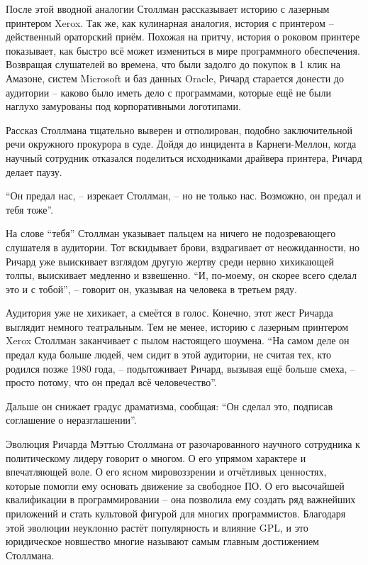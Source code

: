 После этой вводной аналогии Столлман рассказывает историю с лазерным принтером Xerox. Так же, как кулинарная аналогия, история с принтером -- действенный ораторский приём. Похожая на притчу, история о роковом принтере показывает, как быстро всё может измениться в мире программного обеспечения. Возвращая слушателей во времена, что были задолго до покупок в 1 клик на Амазоне, систем Microsoft и баз данных Oracle, Ричард старается донести до аудитории -- каково было иметь дело с программами, которые ещё не были наглухо замурованы под корпоративными логотипами.

Рассказ Столлмана тщательно выверен и отполирован, подобно заключительной речи окружного прокурора в суде. Дойдя до инцидента в Карнеги-Меллон, когда научный сотрудник отказался поделиться исходниками драйвера принтера, Ричард делает паузу.

``Он предал нас, -- изрекает Столлман, -- но не только нас. Возможно, он предал и тебя тоже''.

На слове ``тебя'' Столлман указывает пальцем на ничего не подозревающего слушателя в аудитории. Тот вскидывает брови, вздрагивает от неожиданности, но Ричард уже выискивает взглядом другую жертву среди нервно хихикающей толпы, выискивает медленно и взвешенно. ``И, по-моему, он скорее всего сделал это и с тобой'', -- говорит он, указывая на человека в третьем ряду.

Аудитория уже не хихикает, а смеётся в голос. Конечно, этот жест Ричарда выглядит немного театральным. Тем не менее, историю с лазерным принтером Xerox Столлман заканчивает с пылом настоящего шоумена. ``На самом деле он предал куда больше людей, чем сидит в этой аудитории, не считая тех, кто родился позже 1980 года, -- подытоживает Ричард, вызывая ещё больше смеха, -- просто потому, что он предал всё человечество''.

Дальше он снижает градус драматизма, сообщая:  ``Он сделал это, подписав соглашение о неразглашении''.

Эволюция Ричарда Мэттью Столлмана от разочарованного научного сотрудника к политическому лидеру говорит о многом. О его упрямом характере и впечатляющей воле. О его ясном мировоззрении и отчётливых ценностях, которые помогли ему основать движение за свободное ПО. О его высочайшей квалификации в программировании -- она позволила ему создать ряд важнейших приложений и стать культовой фигурой для многих программистов. Благодаря этой эволюции неуклонно растёт популярность и влияние GPL, и это юридическое новшество многие называют самым главным достижением Столлмана.


